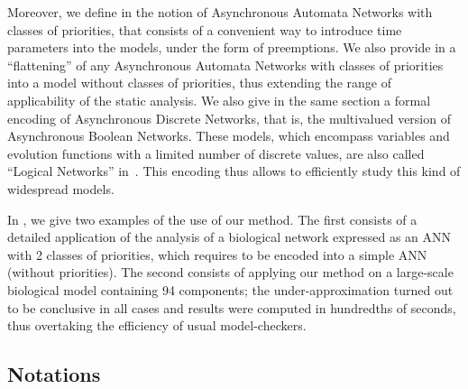 Moreover,
we define in  the notion of Asynchronous Automata Networks
with classes of priorities,
that consists of a convenient way to introduce time parameters
into the models, under the form of preemptions.
We also provide in  a “flattening”
of any Asynchronous Automata Networks with classes of priorities
into a model without classes of priorities,
thus extending the range of applicability of the static analysis.
We also give in the same section a formal encoding of Asynchronous Discrete Networks,
that is, the multivalued version of Asynchronous Boolean Networks.
These models,
which encompass variables and evolution functions with a limited number of discrete values,
are also called “Logical Networks” in~\cite{Thomas95,deJong02}.
This encoding thus allows to efficiently study this kind of widespread models.

In , we give two examples of the use of our method.
The first consists of a detailed application of the analysis of a biological network expressed as
an ANN with 2 classes of priorities,
which requires to be encoded into a simple ANN (without priorities).
The second consists of applying our method
on a large-scale biological model containing 94 components;
the under-approximation turned out to be conclusive in all cases and results were computed in hundredths of seconds,
thus overtaking the efficiency of usual model-checkers.




\subsection*{Notations}
\label{notations}

